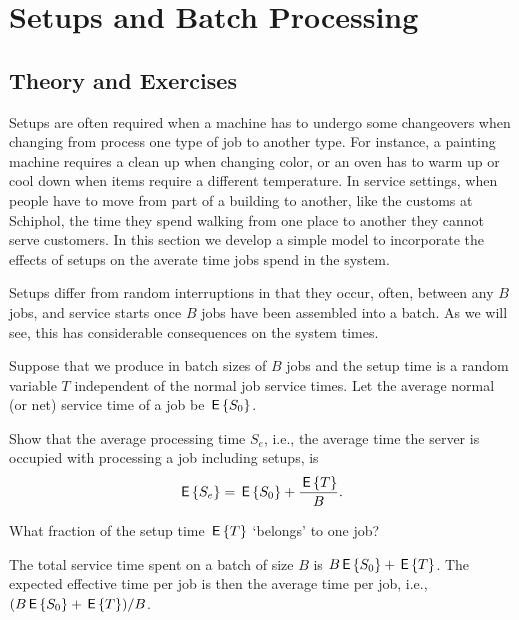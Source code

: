 \section{Setups and Batch Processing}


\subsection*{Theory and Exercises}


Setups are often required when a machine has to undergo some changeovers when changing from process one type of job to  another type. For instance, a painting machine requires a clean up when changing color, or an oven has to warm up or cool down when items require a different temperature. In service settings, when people have to move from part of a building to another, like the customs at Schiphol, the time they spend walking from one place to another they  cannot serve customers.  In this section we develop a simple model to incorporate the effects  of setups on the averate time jobs spend in the system.

Setups differ from random interruptions in that they occur, often, between any $B$ jobs, and service starts once $B$ jobs have been assembled into a batch. As we will see, this has considerable consequences on the system times. 

Suppose that we produce in batch sizes of $B$ jobs and the setup time is a random variable $T$ independent of the normal job service times. Let the average normal (or net) service time of a job be $\,\mathsf{E}\left\{S_0\right\}$. 
\begin{exercise}
  Show that the average  processing time $S_e$, i.e., the average time the server is occupied with processing a job including setups, is 
  \begin{equation*}
    \,\mathsf{E}\left\{S_e\right\} = \,\mathsf{E}\left\{S_0\right\} + \frac{\,\mathsf{E}\left\{T\right\}} B.
  \end{equation*}
  \begin{hint}
    What fraction of the setup time $\,\mathsf{E}\left\{T\right\}$ `belongs' to one job?
  \end{hint}
  \begin{solution}
    The total service time spent on a batch of size $B$ is $B \,\mathsf{E}\left\{S_0\right\} + \,\mathsf{E}\left\{T\right\}$. The expected effective time per job is then the average time per job, i.e.,  $(B \,\mathsf{E}\left\{S_0\right\}+\,\mathsf{E}\left\{T\right\})/B$. 
  \end{solution}
\end{exercise}

